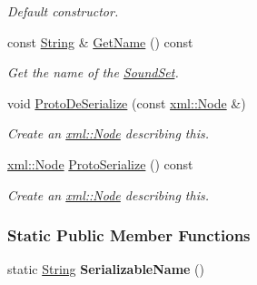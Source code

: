 \begin{DoxyCompactItemize}
\begin{DoxyCompactList}\small\item\em Default constructor. \item\end{DoxyCompactList}\item 
const \hyperlink{namespaceMezzanine_acf9fcc130e6ebf08e3d8491aebcf1c86}{String} \& \hyperlink{classMezzanine_1_1Audio_1_1SoundSet_a98db3c1de2ec5aa26bfdb990df0a8de5}{GetName} () const 
\begin{DoxyCompactList}\small\item\em Get the name of the \hyperlink{classMezzanine_1_1Audio_1_1SoundSet}{SoundSet}. \item\end{DoxyCompactList}\item 
void \hyperlink{classMezzanine_1_1Audio_1_1SoundSet_adc57b4e4b9618f481b99d4df42fed9fa}{ProtoDeSerialize} (const \hyperlink{classMezzanine_1_1xml_1_1Node}{xml::Node} \&)
\begin{DoxyCompactList}\small\item\em Create an \hyperlink{classMezzanine_1_1xml_1_1Node}{xml::Node} describing this. \item\end{DoxyCompactList}\item 
\hyperlink{classMezzanine_1_1xml_1_1Node}{xml::Node} \hyperlink{classMezzanine_1_1Audio_1_1SoundSet_a6eb7cfc0fc2ee768fd9df36ede43d740}{ProtoSerialize} () const 
\begin{DoxyCompactList}\small\item\em Create an \hyperlink{classMezzanine_1_1xml_1_1Node}{xml::Node} describing this. \item\end{DoxyCompactList}\end{DoxyCompactItemize}
\subsubsection*{Static Public Member Functions}
\begin{DoxyCompactItemize}
\item 
\hypertarget{classMezzanine_1_1Audio_1_1SoundSet_a0eb68b7cb88dd5d4b23117e11caf3f51}{
static \hyperlink{namespaceMezzanine_acf9fcc130e6ebf08e3d8491aebcf1c86}{String} {\bfseries SerializableName} ()}
\label{classMezzanine_1_1Audio_1_1SoundSet_a0eb68b7cb88dd5d4b23117e11caf3f51}

\end{DoxyCompactItemize}
